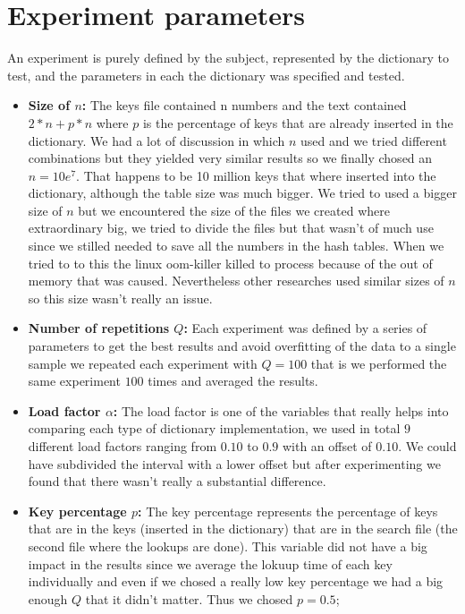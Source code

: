 \documentclass{article}
\begin{document}
    \section{Experiment parameters}
    An experiment is purely defined by the subject, represented by the dictionary to test, and the parameters in each the dictionary was specified and tested. 
    \begin{itemize}
    \item \textbf{Size of $n$:}
           The keys file contained n numbers and the text contained $2 * n + p * n$ where $p$ is the percentage of keys that are already inserted in the dictionary. 
           We had a lot of discussion in which $n$ used and we tried different combinations but they yielded very similar results so we finally chosed an $n=10e^7$. 
           That happens to be 10 million keys that where inserted into the dictionary, although the table size was much bigger. We tried to used a bigger size of $n$
           but we encountered the size of the files we created where extraordinary big, we tried to divide the files but that wasn't of much use since we stilled needed to 
           save all the numbers in the hash tables. When we tried to to this the linux oom-killer killed to process because of the out of memory that was caused. Nevertheless 
           other researches \cite{ARTICLE:2} used similar sizes of $n$ so this size wasn't really an issue. 
    \item \textbf{Number of repetitions $Q$:}
               Each experiment was defined by a series of parameters to get the best results and avoid overfitting of the data to a single sample we 
               repeated each experiment with $Q=100$ that is we performed the same experiment $100$ times and averaged the results. 
   
   \item \textbf{Load factor $\alpha$:}
           The load factor is one of the variables that really helps into comparing each type of dictionary implementation, we used in total 
           $9$ different load factors ranging from $0.10$ to $0.9$ with an offset of $0.10$. We could have subdivided the interval with a lower 
           offset but after experimenting we found that there wasn't really a substantial difference. 
           
   \item \textbf{Key percentage $p$:}
          The key percentage represents the percentage of keys that are in the keys (inserted in the dictionary) that are in the search file (the second file where the lookups are done). 
          This variable did not have a big impact in the results since we average the lokuup time of each key individually and even if we chosed a really low key percentage we had a big enough 
          $Q$ that it didn't matter. Thus we chosed $p=0.5$;
          

\end{itemize}
\end{document}
